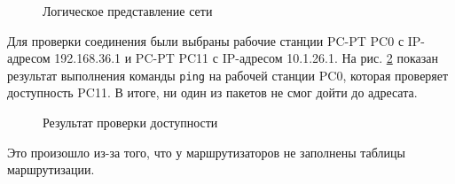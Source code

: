 \documentclass[a4paper, 14pt]{extarticle}
\begin{document}
\begin{figure}[H]
  \centering
  \caption{Логическое представление сети}
  \label{fig:network-6.png}
\end{figure}

Для проверки соединения были выбраны рабочие станции PC-PT PC0 с IP-адресом
192.168.36.1 и PC-PT PC11 с IP-адресом 10.1.26.1. На рис.
\ref{fig:ping/before.png} показан результат выполнения команды \texttt{ping} на
рабочей станции PC0, которая проверяет доступность PC11. В итоге, ни один из
пакетов не смог дойти до адресата.

\begin{figure}[H]
  \centering
  \caption{Результат проверки доступности}
  \label{fig:ping/before.png}
\end{figure}

Это произошло из-за того, что у маршрутизаторов не заполнены таблицы
маршрутизации.
\end{document}
